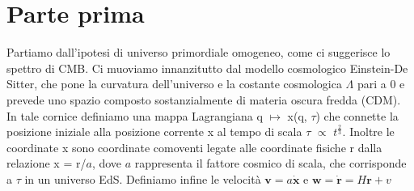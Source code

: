 \section{Parte prima}

\begin{comment}

Le singolarità sono una caratteristica essenziale di molte discipline, e hanno talvolta conseguenze
drammatiche sul modello matematico\dots

In cosmologia, le caustiche sono i processi fondanti della formazione delle strutture cosmologiche
su larga scala. Queste corrispondono ai punti presso i quali la densità risulta localmente infinita
e sono i prodotti del cosiddetto \textit{shell-crossing}, che si verifica all'incrociarsi delle traiettorie
delle particelle di CDM, e corrispondono dunque alle singolarità matematiche che emergono naturalmente
nel trattare il problema con la dinamica gravitazione Newtoniana.
In particolare con al primo shell-crossing le particelle si spostano dal regime di \textit{single-stream}
a quello di \textit{multistreaming}, dove le orbite particellari si intersecano e i fenomeni di shell-crossing
si moltiplicano, determinando il diramarsi dei flussi.

Nel regime di single-stream l'approssimazione di Zel'dovich è opportuna, in quanto costitusice un modello non
accelerato dove le particelle procedono imperturbate e a velocità costante (quale velocità, comovente?).
Tuttavia non appena entriamo in multistreaming l'approssimazione perde di validità, in quanto non prevede
effetti di accelerazione gravitazionale.

\end{comment}
Partiamo dall'ipotesi di universo primordiale omogeneo, come ci suggerisce lo spettro di CMB.
Ci muoviamo innanzitutto dal modello cosmologico Einstein-De Sitter, che pone la curvatura dell'universo
e la costante cosmologica $\Lambda$ pari a 0 e prevede uno spazio composto sostanzialmente di materia
oscura fredda (CDM).
In tale cornice definiamo una mappa Lagrangiana q $\mapsto$ x(q, $\tau$) che connette la posizione
iniziale alla posizione corrente x al tempo di scala $\tau$ $\propto$ $t^{\frac{2}{3}}$.
Inoltre le coordinate x sono coordinate comoventi legate alle coordinate fisiche r dalla relazione
x = r/$a$, dove $a$ rappresenta il fattore cosmico di scala, che corrisponde a $\tau$ in un universo
EdS.
Definiamo infine le velocità $\bm{v} = a \dot{\bm{x}}$ e $\bm{w} = \dot{\bm{r}} = H \bm{r} + v$

